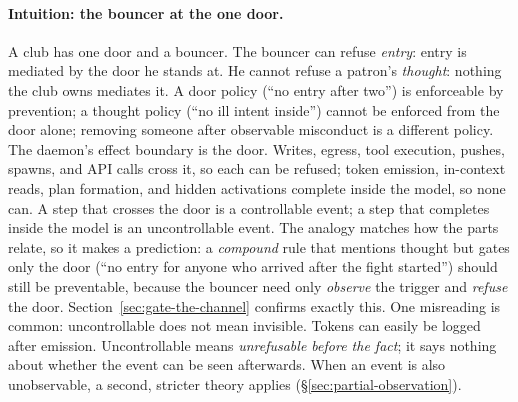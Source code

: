 \documentclass[11pt,a4paper]{article}
\theoremstyle{definition}
\theoremstyle{remark}
\begin{document}
\paragraph{Intuition: the bouncer at the one door.}
A club has one door and a bouncer. The bouncer can refuse \emph{entry}: entry is mediated by
the door he stands at. He cannot refuse a patron's \emph{thought}: nothing the club owns
mediates it. A door policy (``no entry after two'') is enforceable by prevention; a thought
policy (``no ill intent inside'') cannot be enforced from the door alone;
removing someone after observable misconduct is a different policy. The daemon's effect boundary is the door. Writes, egress, tool execution,
pushes, spawns, and API calls cross it, so each can be refused; token emission, in-context
reads, plan formation, and hidden activations complete inside the model, so none can.
A step that crosses the door is a controllable event; a step that
completes inside the model is an uncontrollable event. The analogy
matches how the parts relate, so it makes a prediction: a
\emph{compound} rule that mentions thought but gates only the door (``no entry for anyone
who arrived after the fight started'') should still be preventable, because the bouncer need
only \emph{observe} the trigger and \emph{refuse} the door. Section~\ref{sec:gate-the-channel}
confirms exactly this. One misreading is common: uncontrollable does not mean
invisible. Tokens can easily be logged after emission. Uncontrollable means
\emph{unrefusable before the fact}; it says nothing about whether the event can
be seen afterwards. When an event is also unobservable, a second, stricter
theory applies (\S\ref{sec:partial-observation}).
\end{document}
